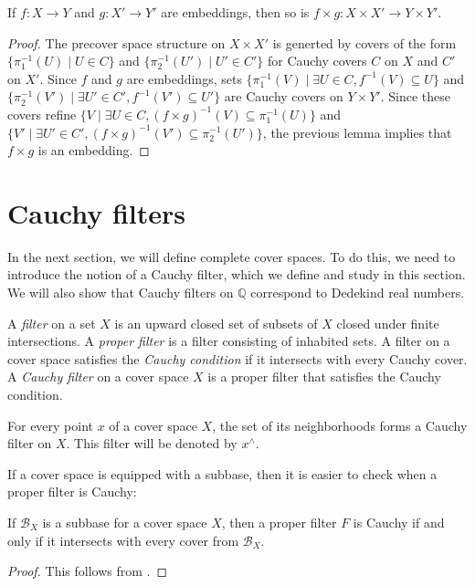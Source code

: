 \documentclass[reqno]{amsart}
\theoremstyle{definition}
\theoremstyle{remark}
\numberwithin{figure}{section}
\begin{document}
\begin{lem}
If $f : X \to Y$ and $g : X' \to Y'$ are embeddings, then so is $f \times g : X \times X' \to Y \times Y'$.
\end{lem}
\begin{proof}
The precover space structure on $X \times X'$ is generted by covers of the form $\{ \pi_1^{-1}(U) \mid U \in C \}$ and $\{ \pi_2^{-1}(U') \mid U' \in C' \}$ for Cauchy covers $C$ on $X$ and $C'$ on $X'$.
Since $f$ and $g$ are embeddings, sets $\{ \pi_1^{-1}(V) \mid \exists U \in C, f^{-1}(V) \subseteq U \}$ and $\{ \pi_2^{-1}(V') \mid \exists U' \in C', f^{-1}(V') \subseteq U' \}$ are Cauchy covers on $Y \times Y'$.
Since these covers refine $\{ V \mid \exists U \in C, (f \times g)^{-1}(V) \subseteq \pi_1^{-1}(U) \}$ and $\{ V' \mid \exists U' \in C', (f \times g)^{-1}(V') \subseteq \pi_2^{-1}(U') \}$, the previous lemma implies that $f \times g$ is an embedding.
\end{proof}

\section{Cauchy filters}
\label{sec:filters}

In the next section, we will define complete cover spaces.
To do this, we need to introduce the notion of a Cauchy filter, which we define and study in this section.
We will also show that Cauchy filters on $\mathbb{Q}$ correspond to Dedekind real numbers.

\begin{defn}
A \emph{filter} on a set $X$ is an upward closed set of subsets of $X$ closed under finite intersections.
A \emph{proper filter} is a filter consisting of inhabited sets.
A filter on a cover space satisfies the \emph{Cauchy condition} if it intersects with every Cauchy cover.
A \emph{Cauchy filter} on a cover space $X$ is a proper filter that satisfies the Cauchy condition.
\end{defn}

\begin{example}
For every point $x$ of a cover space $X$, the set of its neighborhoods forms a Cauchy filter on $X$.
This filter will be denoted by $x^\wedge$.
\end{example}

If a cover space is equipped with a subbase, then it is easier to check when a proper filter is Cauchy:

\begin{prop}
If $\mathcal{B}_X$ is a subbase for a cover space $X$, then a proper filter $F$ is Cauchy if and only if it intersects with every cover from $\mathcal{B}_X$.
\end{prop}
\begin{proof}
This follows from .
\end{proof}
\end{document}
